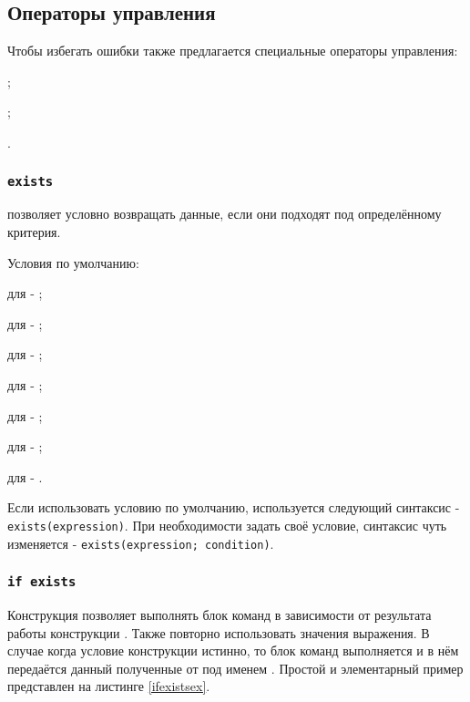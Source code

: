 \subsection{Операторы управления}

Чтобы избегать ошибки также предлагается специальные операторы управления:
\begin{icItems}
	\item {};
	\item {};
	\item {}.
\end{icItems}

\subsubsection{\lstinline|exists|}

 позволяет условно возвращать данные, если они подходят под определённому критерия.

Условия по умолчанию:
\begin{icItems}
	\item
	для \bool{} - ;
	\item
	для \integer{} - ;
	\item
	для \double{} - ;
	\item
	для \str{} - ;
	\item
	для \listtype{} - ;
	\item
	для \set{} - ;
	\item
	для \element{} - .
\end{icItems}

Если использовать условию по умолчанию, используется следующий синтаксис - \lstinline|exists(expression)|.
При необходимости задать своё условие, синтаксис чуть изменяется - \lstinline|exists(expression; condition)|.

\subsubsection{\lstinline|if exists|}

Конструкция  позволяет выполнять блок команд в зависимости от результата работы конструкции . Также повторно использовать значения выражения. В случае когда условие конструкции  истинно, то блок команд выполняется и в нём передаётся данный полученные от  под именем .
Простой и элементарный пример представлен на листинге \ref{ifexistsex}.

